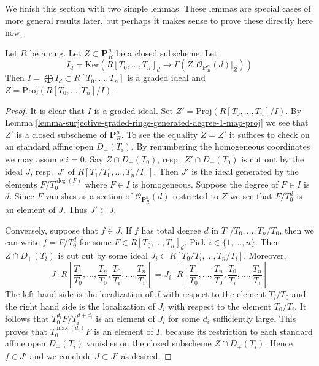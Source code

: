 \noindent
We finish this section with two simple lemmas.
These lemmas are special cases of more general results later, but
perhaps it makes sense to prove these directly here now.

\begin{lemma}
\label{lemma-closed-in-projective-space}
Let $R$ be a ring. Let $Z \subset \mathbf{P}^n_R$ be a closed subscheme.
Let
$$
I_d = \text{Ker}\left(
R[T_0, \ldots, T_n]_d
\longrightarrow
\Gamma(Z, \mathcal{O}_{\mathbf{P}^n_R}(d)|_Z)\right)
$$
Then $I = \bigoplus I_d \subset R[T_0, \ldots, T_n]$ is
a graded ideal and $Z = \text{Proj}(R[T_0, \ldots, T_n]/I)$.
\end{lemma}

\begin{proof}
It is clear that $I$ is a graded ideal.
Set $Z' = \text{Proj}(R[T_0, \ldots, T_n]/I)$.
By Lemma \ref{lemma-surjective-graded-rings-generated-degree-1-map-proj}
we see that $Z'$ is a closed subscheme of $\mathbf{P}^n_R$.
To see the equality $Z = Z'$
it suffices to check on an standard affine open
$D_{+}(T_i)$. By renumbering the homogeneous coordinates we
may assume $i = 0$. Say $Z \cap D_{+}(T_0)$, resp.\ $Z' \cap D_{+}(T_0)$
is cut out by the ideal $J$, resp.\ $J'$ of $R[T_1/T_0, \ldots, T_n/T_0]$.
Then $J'$ is the ideal generated by the elements $F/T_0^{\deg(F)}$ where
$F \in I$ is homogeneous.
Suppose the degree of $F \in I$ is $d$. Since $F$ vanishes as a section
of $\mathcal{O}_{\mathbf{P}^n_R}(d)$ restricted to $Z$ we see that
$F/T_0^d$ is an element of $J$. Thus $J' \subset J$.

\medskip\noindent
Conversely, suppose that $f \in J$. If $f$ has total degree
$d$ in $T_1/T_0, \ldots, T_n/T_0$, then we can write
$f = F/T_0^d$ for some $F \in R[T_0, \ldots, T_n]_d$.
Pick $i \in \{1, \ldots, n\}$. Then $Z \cap D_{+}(T_i)$ is
cut out by some ideal $J_i \subset R[T_0/T_i, \ldots, T_n/T_i]$.
Moreover,
$$
J \cdot
R\left[
\frac{T_1}{T_0}, \ldots, \frac{T_n}{T_0},
\frac{T_0}{T_i}, \ldots, \frac{T_n}{T_i}
\right]
=
J_i \cdot
R\left[
\frac{T_1}{T_0}, \ldots, \frac{T_n}{T_0},
\frac{T_0}{T_i}, \ldots, \frac{T_n}{T_i}
\right]
$$
The left hand side is the localization of $J$ with respect to the
element $T_i/T_0$ and the right hand side is the localization of $J_i$
with respect to the element $T_0/T_i$. It follows that
$T_0^{d_i}F/T_i^{d + d_i}$ is an element of $J_i$ for some $d_i$
sufficiently large. This proves that $T_0^{\max(d_i)}F$ is an
element of $I$, because its restriction to each standard affine
open $D_{+}(T_i)$ vanishes on the closed subscheme
$Z \cap D_{+}(T_i)$. Hence $f \in J'$ and we conclude $J \subset J'$
as desired.
\end{proof}

